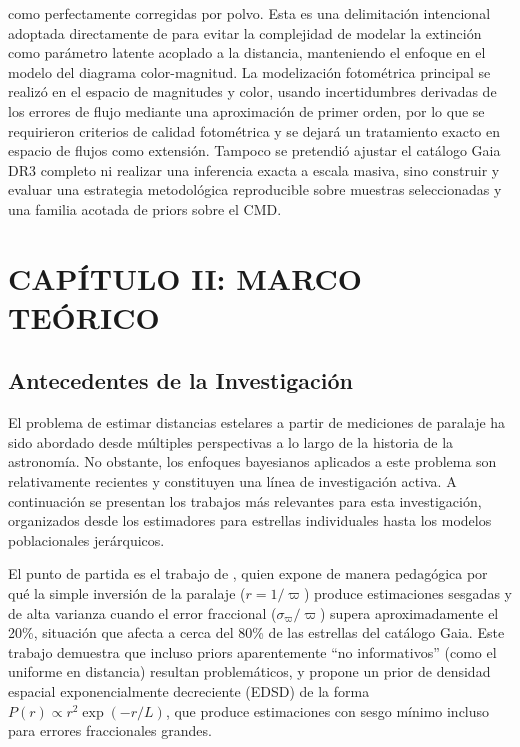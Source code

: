 \documentclass[stu, 12pt, letterpaper, donotrepeattitle, floatsintext, natbib]{apa7_ula}
\begin{document}
\begin{itemize}
    como perfectamente corregidas por polvo. Esta es una delimitación
    intencional adoptada directamente de \citet{Leistedt_2017} para
    evitar la complejidad de modelar la extinción como parámetro latente acoplado
    a la distancia, manteniendo el enfoque en el modelo del diagrama
    color-magnitud. La modelización fotométrica principal se realizó en el
    espacio de magnitudes y color, usando incertidumbres derivadas de
    los errores de flujo mediante una aproximación de primer orden,
    por lo que se requirieron criterios de calidad fotométrica y se
    dejará un tratamiento exacto en espacio de flujos como extensión.
    Tampoco se pretendió ajustar el catálogo Gaia DR3 completo ni
    realizar una inferencia exacta a escala masiva, sino construir y
    evaluar una estrategia metodológica reproducible sobre muestras
    seleccionadas y una familia acotada de priors sobre el CMD.
\end{itemize}

\newpage
\section{CAPÍTULO II: MARCO TEÓRICO}

\subsection{Antecedentes de la Investigación}

El problema de estimar distancias estelares a partir de mediciones de
paralaje ha sido abordado desde múltiples perspectivas a lo largo de
la historia de la astronomía. No obstante, los enfoques bayesianos
aplicados a este problema son relativamente recientes y constituyen
una línea de investigación activa. A continuación se presentan los
trabajos más relevantes para esta investigación, organizados desde
los estimadores para estrellas individuales hasta los modelos
poblacionales jerárquicos.

El punto de partida es el trabajo de \citet{Bailer_2015},
quien expone de manera pedagógica por qué la simple inversión de la
paralaje ($r = 1/\varpi$) produce estimaciones sesgadas y de alta
varianza cuando el error fraccional ($\sigma_\varpi / \varpi$) supera
aproximadamente el 20\%, situación que afecta a cerca del 80\% de las
estrellas del catálogo Gaia. Este trabajo demuestra que incluso priors
aparentemente ``no informativos'' (como el uniforme en distancia)
resultan problemáticos, y propone un prior de densidad espacial
exponencialmente decreciente (EDSD) de la forma
$P(r) \propto r^2 \exp(-r/L)$, que produce estimaciones con sesgo
mínimo incluso para errores fraccionales grandes.
\end{document}
